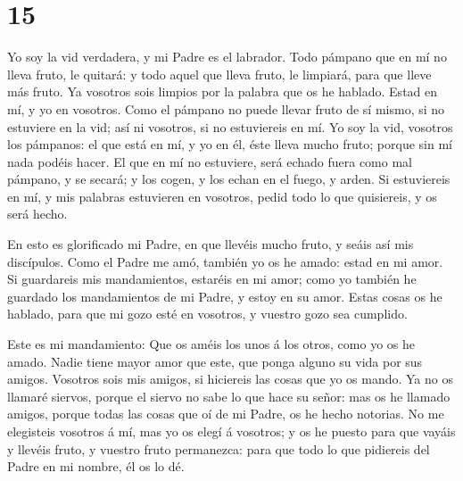 \hypertarget{section-14}{%
\section{15}\label{section-14}}

 Yo soy la vid verdadera, y mi Padre es el labrador.
 Todo pámpano que en mí no lleva fruto, le quitará: y todo
aquel que lleva fruto, le limpiará, para que lleve más fruto.
 Ya vosotros sois limpios por la palabra que os he hablado.
 Estad en mí, y yo en vosotros. Como el pámpano no puede
llevar fruto de sí mismo, si no estuviere en la vid; así ni vosotros, si
no estuviereis en mí.  Yo soy la vid, vosotros los pámpanos:
el que está en mí, y yo en él, éste lleva mucho fruto; porque sin mí
nada podéis hacer.  El que en mí no estuviere, será echado
fuera como mal pámpano, y se secará; y los cogen, y los echan en el
fuego, y arden.  Si estuviereis en mí, y mis palabras
estuvieren en vosotros, pedid todo lo que quisiereis, y os será hecho.

 En esto es glorificado mi Padre, en que llevéis mucho
fruto, y seáis así mis discípulos.  Como el Padre me amó,
también yo os he amado: estad en mi amor.  Si guardareis
mis mandamientos, estaréis en mi amor; como yo también he guardado los
mandamientos de mi Padre, y estoy en su amor.  Estas cosas
os he hablado, para que mi gozo esté en vosotros, y vuestro gozo sea
cumplido.

 Este es mi mandamiento: Que os améis los unos á los otros,
como yo os he amado.  Nadie tiene mayor amor que este, que
ponga alguno su vida por sus amigos.  Vosotros sois mis
amigos, si hiciereis las cosas que yo os mando.  Ya no os
llamaré siervos, porque el siervo no sabe lo que hace su señor: mas os
he llamado amigos, porque todas las cosas que oí de mi Padre, os he
hecho notorias.  No me elegisteis vosotros á mí, mas yo os
elegí á vosotros; y os he puesto para que vayáis y llevéis fruto, y
vuestro fruto permanezca: para que todo lo que pidiereis del Padre en mi
nombre, él os lo dé.

